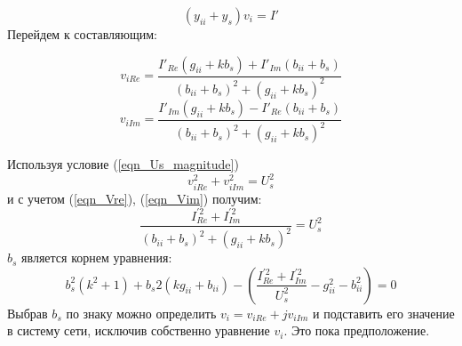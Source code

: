 \documentclass[lettersize,journal]{IEEEtran}
\begin{document}
\begin{equation}
	\label{eqn_implicit_ys}
	(y_{ii} + y_s)v_i = I'
\end{equation}
Перейдем к составляющим:

\begin{equation}
	\label{eqn_Vre}
	v_{iRe} = \frac{I'_{Re}(g_{ii}+kb_s) + I'_{Im}(b_{ii}+b_s)}{(b_{ii}+b_s)^2+(g_{ii}+kb_s)^2}
\end{equation}
\begin{equation}
	\label{eqn_Vim}
	v_{iIm} = \frac{I'_{Im}(g_{ii}+kb_s) - I'_{Re}(b_{ii}+b_s)}{(b_{ii}+b_s)^2+(g_{ii}+kb_s)^2}
\end{equation}

Используя условие (\ref{eqn_Us_magnitude}) 
\begin{equation}
	\label{eqn_Vre_Vim_Abs}
	v_{iRe}^2+v_{iIm}^2 = U_s^2
\end{equation}
и с учетом (\ref{eqn_Vre}), (\ref{eqn_Vim}) получим:
\begin{equation}
	\label{eqn_bs1}
	\frac{I_{Re}^{'2}+I_{Im}^{'2}}{(b_{ii}+b_s)^2+(g_{ii}+kb_s)^2} = U_s^2
\end{equation}
\(b_s\) является корнем уравнения:
\begin{equation}
	\label{eqn_bs2}
	b_s^2(k^2+1) + b_s2(kg_{ii}+b_{ii}) - \left(\frac{I_{Re}^{'2}+I_{Im}^{'2}}{U_s^2} - g_{ii}^2 - b_{ii}^2\right)=0
\end{equation}
Выбрав \(b_s\) по знаку можно определить \(v_i=v_{iRe}+jv_{iIm}\) и подставить его значение в систему сети, исключив собственно уравнение \(v_i\). Это пока предположение.
\end{document}
